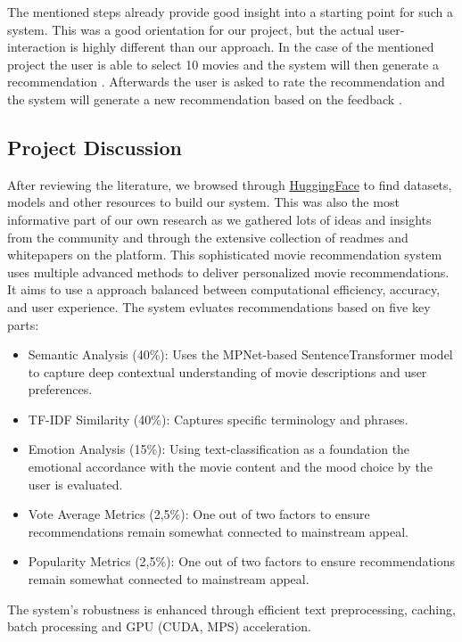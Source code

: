 \documentclass[12pt,a4paper]{article}
\begin{document}
\noindent The mentioned steps already provide good insight into a starting point for such a system.
This was a good orientation for our project, but the actual user-interaction is highly different than our approach.
In the case of the mentioned project the user is able to select 10 movies and the system will then generate a recommendation \cite{Iglesias-pardo-lopez-quintero-2024}.
Afterwards the user is asked to rate the recommendation and the system will generate a new recommendation based on the feedback \cite{Iglesias-pardo-lopez-quintero-2024}.

\subsection{Project Discussion}

After reviewing the literature, we browsed through \href{https://www.huggingface.com/}{HuggingFace} to find datasets,
models and other resources to build our system.
This was also the most informative part of our own research as we gathered lots of ideas and insights from the community
and through the extensive collection of readmes and whitepapers on the platform.
This sophisticated movie recommendation system uses multiple advanced methods to deliver personalized movie recommendations.
It aims to use a approach balanced between computational efficiency, accuracy, and user experience.
The system evluates recommendations based on five key parts:
\begin{itemize}
  \item Semantic Analysis (40\%): Uses the MPNet-based SentenceTransformer model to capture deep contextual understanding of movie descriptions and user preferences.
  \item TF-IDF Similarity (40\%): Captures specific terminology and phrases.
  \item Emotion Analysis (15\%): Using text-classification as a foundation the emotional accordance with the movie content and the mood choice by the user is evaluated.
  \item Vote Average Metrics (2,5\%): One out of two factors to ensure recommendations remain somewhat connected to mainstream appeal.
  \item Popularity Metrics (2,5\%): One out of two factors to ensure recommendations remain somewhat connected to mainstream appeal.
\end{itemize}

\noindent The system’s robustness is enhanced through efficient text preprocessing, caching, batch processing and GPU (CUDA, MPS) acceleration.
\end{document}
